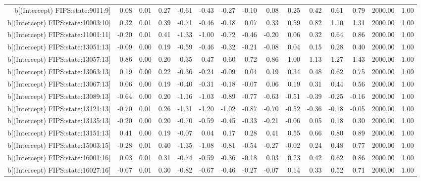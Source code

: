 \begin{table}[ht]
\begin{tabular}{rrrrrrrrrrrrrrr}
  b[(Intercept) FIPS:state:9011:9] & 0.08 & 0.01 & 0.27 & -0.61 & -0.43 & -0.27 & -0.10 & 0.08 & 0.25 & 0.42 & 0.61 & 0.79 & 2000.00 & 1.00 \\ 
  b[(Intercept) FIPS:state:10003:10] & 0.32 & 0.01 & 0.39 & -0.71 & -0.46 & -0.18 & 0.07 & 0.33 & 0.59 & 0.82 & 1.10 & 1.31 & 2000.00 & 1.00 \\ 
  b[(Intercept) FIPS:state:11001:11] & -0.20 & 0.01 & 0.41 & -1.33 & -1.00 & -0.72 & -0.46 & -0.20 & 0.06 & 0.32 & 0.64 & 0.86 & 2000.00 & 1.00 \\ 
  b[(Intercept) FIPS:state:13051:13] & -0.09 & 0.00 & 0.19 & -0.59 & -0.46 & -0.32 & -0.21 & -0.08 & 0.04 & 0.15 & 0.28 & 0.40 & 2000.00 & 1.00 \\ 
  b[(Intercept) FIPS:state:13057:13] & 0.86 & 0.00 & 0.20 & 0.35 & 0.47 & 0.60 & 0.72 & 0.86 & 1.00 & 1.13 & 1.27 & 1.43 & 2000.00 & 1.00 \\ 
  b[(Intercept) FIPS:state:13063:13] & 0.19 & 0.00 & 0.22 & -0.36 & -0.24 & -0.09 & 0.04 & 0.19 & 0.34 & 0.48 & 0.62 & 0.75 & 2000.00 & 1.00 \\ 
  b[(Intercept) FIPS:state:13067:13] & 0.06 & 0.00 & 0.19 & -0.40 & -0.31 & -0.18 & -0.07 & 0.06 & 0.19 & 0.31 & 0.44 & 0.56 & 2000.00 & 1.00 \\ 
  b[(Intercept) FIPS:state:13089:13] & -0.64 & 0.00 & 0.20 & -1.16 & -1.03 & -0.89 & -0.77 & -0.63 & -0.51 & -0.39 & -0.25 & -0.16 & 2000.00 & 1.00 \\ 
  b[(Intercept) FIPS:state:13121:13] & -0.70 & 0.01 & 0.26 & -1.31 & -1.20 & -1.02 & -0.87 & -0.70 & -0.52 & -0.36 & -0.18 & -0.05 & 2000.00 & 1.00 \\ 
  b[(Intercept) FIPS:state:13135:13] & -0.20 & 0.00 & 0.20 & -0.70 & -0.59 & -0.45 & -0.33 & -0.21 & -0.06 & 0.05 & 0.18 & 0.30 & 2000.00 & 1.00 \\ 
  b[(Intercept) FIPS:state:13151:13] & 0.41 & 0.00 & 0.19 & -0.07 & 0.04 & 0.17 & 0.28 & 0.41 & 0.55 & 0.66 & 0.80 & 0.89 & 2000.00 & 1.00 \\ 
  b[(Intercept) FIPS:state:15003:15] & -0.28 & 0.01 & 0.40 & -1.35 & -1.08 & -0.81 & -0.54 & -0.27 & -0.02 & 0.24 & 0.48 & 0.77 & 2000.00 & 1.00 \\ 
  b[(Intercept) FIPS:state:16001:16] & 0.03 & 0.01 & 0.31 & -0.74 & -0.59 & -0.36 & -0.18 & 0.03 & 0.23 & 0.42 & 0.62 & 0.86 & 2000.00 & 1.00 \\ 
  b[(Intercept) FIPS:state:16027:16] & -0.07 & 0.01 & 0.30 & -0.82 & -0.67 & -0.46 & -0.27 & -0.07 & 0.14 & 0.33 & 0.52 & 0.71 & 2000.00 & 1.00 \\ 

\end{tabular}
\end{table}
